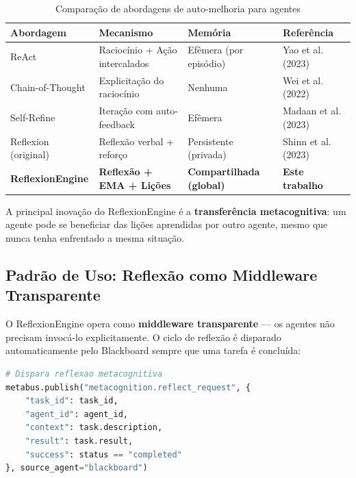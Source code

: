 \begin{table}[htbp]
\centering
\caption{Comparação de abordagens de auto-melhoria para agentes}
\label{tab:reflexion-comparison}
\begin{tabular}{@{}p{2.5cm}p{3.2cm}p{3cm}p{5cm}@{}}
\toprule
\textbf{Abordagem} & \textbf{Mecanismo} & \textbf{Memória} & \textbf{Referência} \\
\midrule
ReAct & Raciocínio + Ação intercalados & Efêmera (por episódio) & Yao et al. (2023) \cite{Yao2023_ReAct} \\
Chain-of-Thought & Explicitação do raciocínio & Nenhuma & Wei et al. (2022) \cite{Wei2022_CoT} \\
Self-Refine & Iteração com auto-feedback & Efêmera & Madaan et al. (2023) \cite{Madaan2023_SelfRefine} \\
Reflexion (original) & Reflexão verbal + reforço & Persistente (privada) & Shinn et al. (2023) \cite{Shinn2023_Reflexion} \\
\textbf{ReflexionEngine} & \textbf{Reflexão + EMA + Lições} & \textbf{Compartilhada (global)} & \textbf{Este trabalho} \\
\bottomrule
\end{tabular}
\end{table}

A principal inovação do ReflexionEngine é a \textbf{transferência metacognitiva}: um agente pode se beneficiar das lições aprendidas por outro agente, mesmo que nunca tenha enfrentado a mesma situação.

\subsection{Padrão de Uso: Reflexão como Middleware Transparente}

O ReflexionEngine opera como \textbf{middleware transparente} — os agentes não precisam invocá-lo explicitamente. O ciclo de reflexão é disparado automaticamente pelo Blackboard sempre que uma tarefa é concluída:

\begin{lstlisting}[language=Python, caption={Blackboard dispara reflexão automaticamente (\texttt{mci/blackboard.py}, linhas 161--168)}, label={lst:blackboard-reflex}, float=htbp]
# Dispara reflexao metacognitiva
metabus.publish("metacognition.reflect_request", {
    "task_id": task_id,
    "agent_id": agent_id,
    "context": task.description,
    "result": task.result,
    "success": status == "completed"
}, source_agent="blackboard")
\end{lstlisting}

